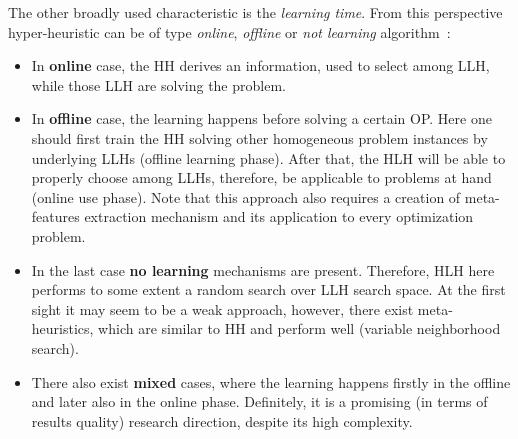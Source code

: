 The other broadly used characteristic is the \emph{learning time}. From this perspective hyper-heuristic can be of type \emph{online}, \emph{offline} or \emph{not learning} algorithm~\cite{ryser2014review,burke2019classification}:
\begin{itemize}
	\item In \textbf{online} case, the HH derives an information, used to select among LLH, while those LLH are solving the problem.

	\item In \textbf{offline} case, the learning happens before solving a certain OP. Here one should first train the HH solving other homogeneous problem instances by underlying LLHs (offline learning phase). After that, the HLH will be able to properly choose among LLHs, therefore, be applicable to problems at hand (online use phase). Note that this approach also requires a creation of meta-features extraction mechanism and its application to every optimization problem.
	
	\item In the last case \textbf{no learning} mechanisms are present. Therefore, HLH here performs to some extent a random search over LLH search space. At the first sight it may seem to be a weak approach, however, there exist meta-heuristics, which are similar to HH and perform well (variable neighborhood search).
	
	\item There also exist \textbf{mixed} cases, where the learning happens firstly in the offline and later also in the online phase. Definitely, it is a promising (in terms of results quality) research direction, despite its high complexity.
\end{itemize}



